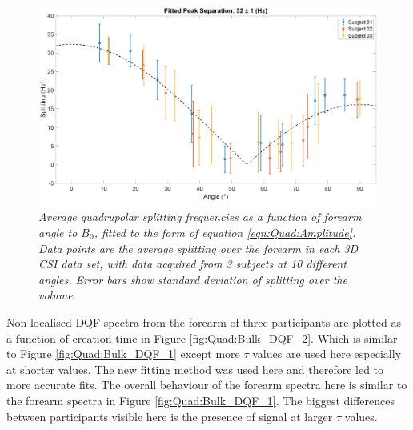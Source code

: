 \begin{figure}
    \centering
    \includegraphics[width=1\textwidth]{Figures/Quad/Split_Angle_2.png}
    \caption{\textit{Average quadrupolar splitting frequencies as a function of forearm angle to $B_0$, fitted to the form of equation \ref{eqn:Quad:Amplitude}. Data points are the average splitting over the forearm in each 3D \ac{CSI} data set, with data acquired from 3 subjects at 10 different angles. Error bars show standard deviation of splitting over the volume.}}
    \label{fig:Quad:Split_Angle_2}
\end{figure}

Non-localised \ac{DQF} spectra from the forearm of three participants are plotted as a function of creation time in Figure \ref{fig:Quad:Bulk_DQF_2}. Which is similar to Figure \ref{fig:Quad:Bulk_DQF_1} except more $\tau$ values are used here especially at shorter values. The new fitting method was used here and therefore led to more accurate fits. The overall behaviour of the forearm spectra here is similar to the forearm spectra in Figure \ref{fig:Quad:Bulk_DQF_1}. The biggest differences between participants visible here is the presence of signal at larger $\tau$ values.

